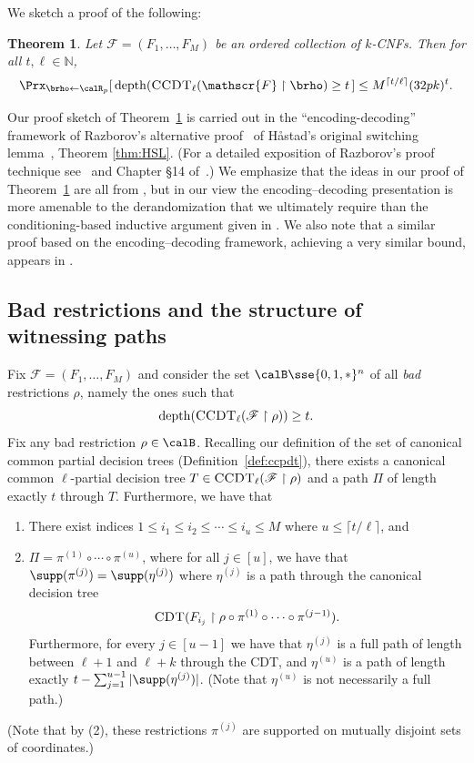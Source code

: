 \documentclass[11pt]{article}
\numberwithin{equation}{section}
\newtheorem{theorem}{Theorem}[section]
\theoremstyle{definition}
\theoremstyle{plain}
\newcommand{\N}{\mathbb N}
\theoremstyle{plain}
\newcommand{\uhr}{\upharpoonright}
\newcommand{\CDT}{\textsc{CDT}}
\newcommand{\CCDT}{\textsc{CCDT}}
\newcommand{\depth}{\mathrm{depth}}
\renewcommand{\N}{\mathds{N}}
\begin{document}
We sketch a proof of the following:

\begin{theorem}
\label{thm:our-HSL14}
Let $\mathscr{F} = (F_1,\ldots,F_M)$ be an ordered collection of $k$-CNFs. Then for all $t ,\ell \in \N$,
\[ \Prx_{\brho\leftarrow\calR_p}[\, \depth(\CCDT_\ell(\mathscr{F}\uhr\brho)\ge t\,] \le M^{\lceil t/\ell\rceil} (32pk)^t.  \] 
\end{theorem} 

Our proof sketch of Theorem~\ref{thm:our-HSL14} is carried out in the ``encoding-decoding'' framework of Razborov's alternative proof~\cite{Raz95} of H{\aa}stad's original switching lemma~\cite{Hastad86}, Theorem \ref{thm:HSL}.  (For a detailed exposition of Razborov's proof technique see~\cite{Beame:94,Tha09} and Chapter \S14 of~\cite{AB09}.)
  We emphasize that the ideas in our proof of Theorem~\ref{thm:our-HSL14} are all from \cite{Has14}, but in our view the encoding--decoding presentation is more amenable to the derandomization that we ultimately require than the conditioning-based inductive argument given in \cite{Has14}.  We also note that a similar proof based on the encoding--decoding framework, achieving a very similar bound, appears 
in %
\cite[Section 7]{Tal:15tightbounds}. %





\subsection{Bad restrictions and the structure of witnessing paths} 

Fix $\mathscr{F} = (F_1,\ldots,F_M)$ and consider the set $\calB \sse \{0,1,\ast\}^n$ of all \emph{bad} restrictions $\rho$, namely the ones such that 
\[ \depth(\CCDT_{\ell}(\mathscr{F}\uhr\rho)) \ge t. \] 
Fix any bad restriction $\rho \in \calB$. Recalling our definition of the set of canonical common partial decision trees (Definition~\ref{def:ccpdt}), there exists a canonical common $\ell$-partial decision tree $T \in \CCDT_\ell(\mathscr{F} \uhr \rho)$ and a path $\Pi$ of length exactly $t$ through $T$. Furthermore, we have that 
\begin{enumerate} 
\item There exist indices $1\le i_1 \le i_2 \le \cdots \le i_u \le M$ where $u \le \lceil t/\ell\rceil$, and 
\item $\Pi = \pi^{(1)} \circ \cdots \circ \pi^{(u)}$, where for all $j\in [u]$, we have that $\supp(\pi^{(j)}) =  \supp(\eta^{(j)})$ where  $\eta^{(j)}$ is a path through the canonical decision tree 
\[ \CDT(F_{i_j} \uhr \rho \circ \pi^{(1)}\circ\cdots\circ \pi^{(j-1)}).\]  
Furthermore, for every $j\in [u-1]$ we have that $\eta^{(j)}$ is a full path of length between $\ell+1$ and $\ell+k$ through the CDT, and $\eta^{(u)}$ is a path of length exactly $t - \sum_{j=1}^{u-1} |\supp(\eta^{(j)})|$. (Note that $\eta^{(u)}$ is not necessarily a full path.)
\end{enumerate}  
(Note that by (2), these restrictions $\pi^{(j)}$ are supported on mutually disjoint sets of coordinates.) 
\end{document}
